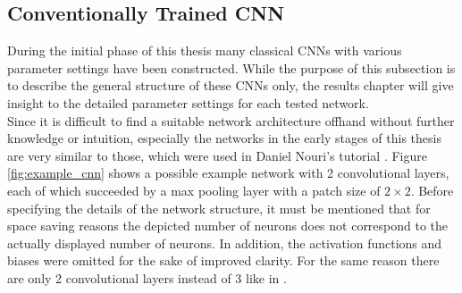 \documentclass[11pt, a4paper]{article}
\begin{document}
\subsection{Conventionally Trained CNN}
\label{subsec:conventiallytrainedcnn}

During the initial phase of this thesis many classical \acp{CNN} with various parameter settings have been constructed. While the purpose of this subsection is to describe the general structure of these \acp{CNN} only, the results chapter will give insight to the detailed para\-meter settings for each tested network.\\
Since it is difficult to find a suitable network architecture offhand without further knowledge or intuition, especially the networks in the early stages of this thesis are very similar to those, which were used in Daniel Nouri's tutorial \cite{nouri-tutorial}. Figure \ref{fig:example_cnn} shows a possible example network with 2 convolutional layers, each of which succeeded by a max pooling layer with a patch size of $2\times 2$. Before specifying the details of the network structure, it must be mentioned that for space saving reasons the depicted number of neurons does not correspond to the actually displayed number of neurons. In addition, the activation functions and biases were omitted for the sake of improved clarity. For the same reason there are only 2 convolutional layers instead of 3 like in \cite{nouri-tutorial}.
\\
\end{document}
